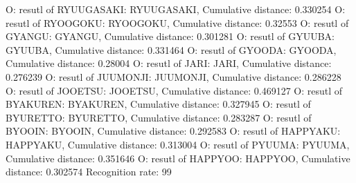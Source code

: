 O: resutl of RYUUGASAKI: RYUUGASAKI, Cumulative distance: 0.330254
O: resutl of RYOOGOKU: RYOOGOKU, Cumulative distance: 0.32553
O: resutl of GYANGU: GYANGU, Cumulative distance: 0.301281
O: resutl of GYUUBA: GYUUBA, Cumulative distance: 0.331464
O: resutl of GYOODA: GYOODA, Cumulative distance: 0.28004
O: resutl of JARI: JARI, Cumulative distance: 0.276239
O: resutl of JUUMONJI: JUUMONJI, Cumulative distance: 0.286228
O: resutl of JOOETSU: JOOETSU, Cumulative distance: 0.469127
O: resutl of BYAKUREN: BYAKUREN, Cumulative distance: 0.327945
O: resutl of BYURETTO: BYURETTO, Cumulative distance: 0.283287
O: resutl of BYOOIN: BYOOIN, Cumulative distance: 0.292583
O: resutl of HAPPYAKU: HAPPYAKU, Cumulative distance: 0.313004
O: resutl of PYUUMA: PYUUMA, Cumulative distance: 0.351646
O: resutl of HAPPYOO: HAPPYOO, Cumulative distance: 0.302574
Recognition rate: 99%
